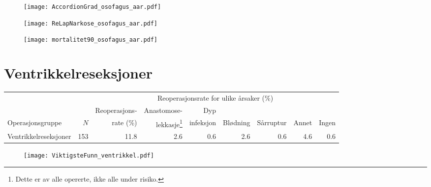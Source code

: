 \documentclass[norsk,a4paper]{article}\usepackage[]{graphicx}\usepackage[]{color}
\begin{document}
\begin{figure}[ht]
\centering
\texttt{[image: AccordionGrad\_osofagus\_aar.pdf]}
\caption{}
\end{figure}

\begin{figure}[ht]
\centering
\texttt{[image: ReLapNarkose\_osofagus\_aar.pdf]}
\caption{}
\end{figure}

\begin{figure}[ht]
\centering
\texttt{[image: mortalitet90\_osofagus\_aar.pdf]}
\caption{}
\end{figure}

\clearpage




\section{Ventrikkelreseksjoner}

\begin{table}[htb]
\begin{minipage}{\textwidth}
\centering
\begin{tabular}{lrrrrrrrr}
  \toprule
  & & & \multicolumn{4}{c}{Reoperasjonsrate for ulike årsaker (\%)} \\
 \cline{4-9} 
 & & Reoperasjons- & Anastomose- & Dyp &&&&  \\
 Operasjonsgruppe & $N$ & rate (\%) & lekkasje\footnote[2]{Dette er av alle opererte, ikke
alle under risiko.} & infeksjon & Blødning & Sårruptur & Annet & Ingen \\
 \midrule
Ventrikkelreseksjoner & 153 & 11.8 & 2.6 & 0.6 & 2.6 & 0.6 & 4.6 & 0.6 \\ 
   \bottomrule
\end{tabular}

\end{minipage}
\end{table}




\begin{figure}[ht]
\centering
\texttt{[image: ViktigsteFunn\_ventrikkel.pdf]}
\caption{}
\end{figure}
\end{document}
